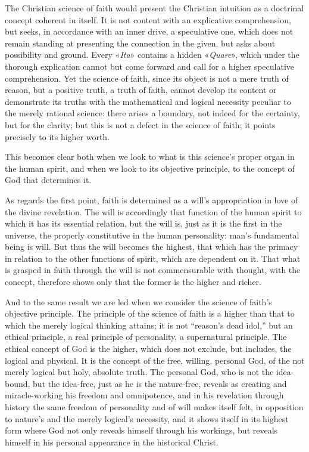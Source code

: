 \documentclass[12pt,a4paper]{book}
\begin{document}
The Christian science of faith would present the Christian intuition as a
doctrinal concept coherent in itself. It is not content with an explicative
comprehension, but seeks, in accordance with an inner drive, a speculative one,
which does not remain standing at presenting the connection in the given, but
asks about possibility and ground. Every «\textit{Ita}» contains a hidden
«\textit{Quare}», which under the thorough explication cannot but come forward and
call for a higher speculative comprehension. Yet the science of faith, since its
object is not a mere truth of reason, but a positive truth, a truth of faith,
cannot develop its content or demonstrate its truths with the mathematical and
logical necessity peculiar to the merely rational science: there arises a
boundary, not indeed for the certainty, but for the clarity; but this is not a
defect in the science of faith; it points precisely to its higher worth.

This becomes clear both when we look to what is this science's proper organ in the
human spirit, and when we look to its objective principle, to the concept of God
that determines it.

As regards the first point, faith is determined as a will's appropriation in love
of the divine revelation. The will is accordingly that function of the human
spirit to which it has its essential relation, but the will is, just as it is the
first in the universe, the properly constitutive in the human personality: man's
fundamental being is will. But thus the will becomes the highest, that which has
the primacy in relation to the other functions of spirit, which are dependent on
it. That what is grasped in faith through the will is not commensurable with
thought, with the concept, therefore shows only that the former is the higher and
richer.

And to the same result we are led when we consider the science of faith's
objective principle. The principle of the science of faith is a higher than that
to which the merely logical thinking attains; it is not ``reason's dead idol,''
but an ethical principle, a real principle of personality, a supernatural
principle. The ethical concept of God is the higher, which does not exclude, but
includes, the logical and physical. It is the concept of the free, willing,
personal God, of the not merely logical but holy, absolute truth. The personal
God, who is not the idea-bound, but the idea-free, just as he is the nature-free,
reveals as creating and miracle-working his freedom and omnipotence, and in his
revelation through history the same freedom of personality and of will makes
itself felt, in opposition to nature's and the merely logical's necessity, and it
shows itself in its highest form where God not only reveals himself through his
workings, but reveals himself in his personal appearance in the historical Christ.
\end{document}
